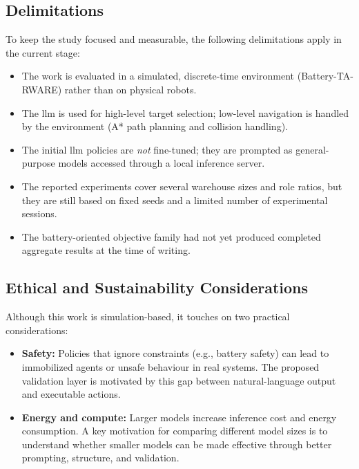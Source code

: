 \subsection{Delimitations}
To keep the study focused and measurable, the following delimitations apply in the current stage:
\begin{itemize}
    \item The work is evaluated in a simulated, discrete-time environment (Battery-TA-RWARE) rather than on physical robots.
    \item The \gls{llm} is used for high-level target selection; low-level navigation is handled by the environment (A* path planning and collision handling).
    \item The initial \gls{llm} policies are \emph{not} fine-tuned; they are prompted as general-purpose models accessed through a local inference server.
    \item The reported experiments cover several warehouse sizes and role ratios, but they are still based on fixed seeds and a limited number of experimental sessions.
    \item The battery-oriented objective family had not yet produced completed aggregate results at the time of writing.
\end{itemize}

\subsection{Ethical and Sustainability Considerations}
Although this work is simulation-based, it touches on two practical considerations:
\begin{itemize}
    \item \textbf{Safety:} Policies that ignore constraints (e.g., battery safety) can lead to immobilized agents or unsafe behaviour in real systems. The proposed validation layer is motivated by this gap between natural-language output and executable actions.
    \item \textbf{Energy and compute:} Larger models increase inference cost and energy consumption. A key motivation for comparing different model sizes is to understand whether smaller models can be made effective through better prompting, structure, and validation.
\end{itemize}
